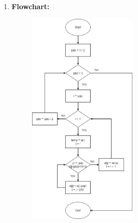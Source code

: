 \documentclass[11pt,a4paper]{article}
\begin{document}
{\begin{enumerate}[label=\textbf{\arabic*})]
\begin{algorithm}[H]
\begin{algorithmic}[1]
            					\State \textcolor{Gray}{/*shift element towards right*/}
            					\vspace{12pt}
            						\State $a[inner] = a[inner-interval]$
            						\State $inner = inner - interval$
            					\EndWhile
            					\vspace{12pt}
            					\State \textcolor{Gray}{/* insert the number at hole position */}
            					\State $a[inner] = valueToInsert$
            				\EndFor
            				\State \textcolor{Gray}{/* calculate interval*/}
            				\State $interval = (interval-1)/3$
            			\EndWhile
            		\EndProcedure
            	\end{algorithmic}
            \end{algorithm}
				\item \textbf{Flowchart:}
					\begin{figure}[H]
						\centering 
						\includegraphics[width=0.5\textwidth]{ShellSortFlowchart}
					\end{figure}
					

\end{enumerate}}
\end{document}
